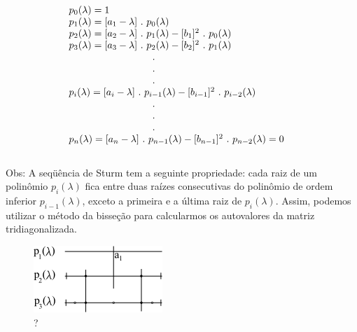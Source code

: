 \begin{equation}
\label{cap5:sec3:eq31}
\begin{array}{ll}
 p_0(\lambda) = 1 & \\
 p_1(\lambda) = [a_1 - \lambda] \, \, . \, \, p_0(\lambda) & \\
 p_2(\lambda) = [a_2 - \lambda] \, \, . \, \, p_1(\lambda) - [b_1]^2 \, \, . \, \, p_0(\lambda) & \\
 p_3(\lambda) = [a_3 - \lambda] \, \, . \, \, p_2(\lambda) - [b_2]^2 \, \, . \, \, p_1(\lambda) & \\
 \hspace*{3cm} . & \\
 \hspace*{3cm} . & \\
 \hspace*{3cm} . & \\
 p_i(\lambda) = [a_i - \lambda] \, \, . \, \, p_{i-1}(\lambda) - [b_{i-1}]^2 \, \, . \, \, p_{i-2}(\lambda) & \\
 \hspace*{3cm} . & \\
 \hspace*{3cm} . & \\
 \hspace*{3cm} . & \\
 p_n(\lambda) = [a_n - \lambda] \, \, . \, \, p_{n-1}(\lambda) - [b_{n-1}]^2 \, \, . \, \, p_{n-2}(\lambda) = 0 &
\end{array}
\end{equation}\\

\noindent
Obs: A seqüência de Sturm tem a seguinte propriedade: cada raiz de um polinômio $ p_i(\lambda) $ fica entre duas raízes consecutivas do polinômio de ordem inferior $ p_{i-1}(\lambda) $, exceto a primeira e a última raiz de $ p_i(\lambda) $. Assim, podemos utilizar o método da bisseção para calcularmos os autovalores da matriz tridiagonalizada.

\begin{figure}[htb]
 \centering
 \includegraphics[scale=1.0]{capitulos/capitulo5/figuras/met_house_mat_sim1.png}
 \caption{?}
 \label{fig:met_house_mat_sim1}
\end{figure}

